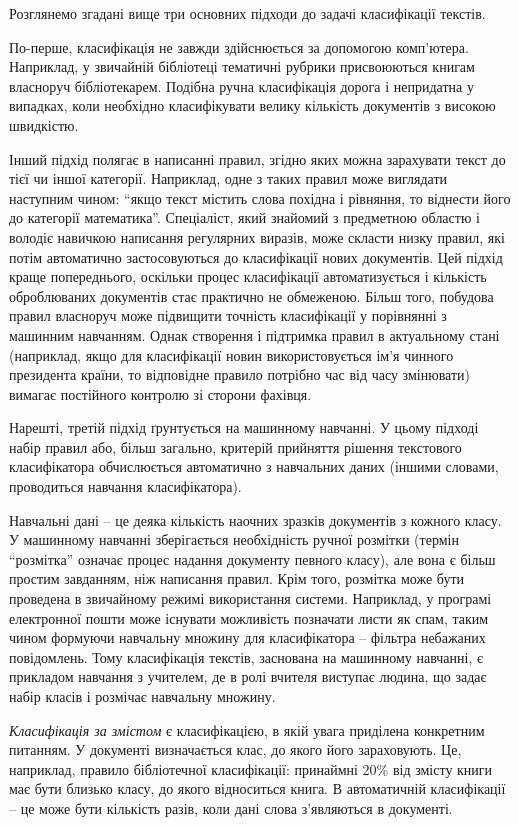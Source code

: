 Розглянемо згадані вище три основних підходи до задачі класифікації текстів.

По-перше, класифікація не завжди здійснюється за допомогою комп'ютера. Наприклад, у звичайній бібліотеці тематичні рубрики присвоюються книгам власноруч бібліотекарем. Подібна ручна класифікація дорога і непридатна у випадках, коли необхідно класифікувати велику кількість документів з високою швидкістю.

Інший підхід полягає в написанні правил, згідно яких можна зарахувати текст до тієї чи іншої категорії. Наприклад, одне з таких правил може виглядати наступним чином: “якщо текст містить слова похідна і рівняння, то віднести його до категорії математика”. Спеціаліст, який знайомий з предметною областю і володіє навичкою написання регулярних виразів, може скласти низку правил, які потім автоматично застосовуються до класифікації нових документів. Цей підхід краще попереднього, оскільки процес класифікації автоматизується і кількість оброблюваних документів стає практично не обмеженою. Більш того, побудова правил власноруч може підвищити точність класифікації у порівнянні з машинним навчанням. Однак створення і підтримка правил в актуальному стані (наприклад, якщо для класифікації новин використовується ім'я чинного президента країни, то відповідне правило потрібно час від часу змінювати) вимагає постійного контролю зі сторони фахівця.

Нарешті, третій підхід ґрунтується на машинному навчанні. У цьому підході набір правил або, більш загально, критерій прийняття рішення текстового класифікатора обчислюється автоматично з навчальних даних (іншими словами, проводиться навчання класифікатора).

Навчальні дані – це деяка кількість наочних зразків документів з кожного класу. У машинному навчанні зберігається необхідність ручної розмітки (термін “розмітка” означає процес надання документу певного класу), але вона є більш простим завданням, ніж написання правил. Крім того, розмітка може бути проведена в звичайному режимі використання системи. Наприклад, у програмі електронної пошти може існувати можливість позначати листи як спам, таким чином формуючи навчальну множину для класифікатора – фільтра небажаних повідомлень. Тому класифікація текстів, заснована на машинному навчанні, є прикладом навчання з учителем, де в ролі вчителя виступає людина, що задає набір класів і розмічає навчальну множину.

\textit{Класифікація за змістом} є класифікацією, в якій увага приділена конкретним питанням. У документі визначається клас, до якого його зараховують. Це, наприклад, правило бібліотечної класифікації: принаймні 20\% від змісту книги має бути близько класу, до якого відноситься книга. В автоматичній класифікації – це може бути кількість разів, коли дані слова з'являються в документі.


